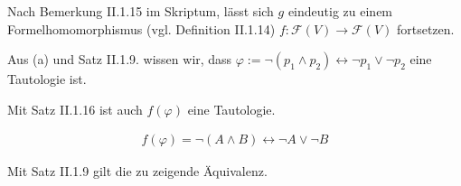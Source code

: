 \begin{solution}
\begin{enumerate}[label = \alph*.]
    Nach Bemerkung II.1.15 im Skriptum, lässt sich $g$ eindeutig zu einem Formelhomomorphismus (vgl. Definition II.1.14) $f:\mathcal{F}(V) \to \mathcal{F}(V)$ fortsetzen.


    Aus (a) und Satz II.1.9. wissen wir, dass $\varphi := \neg (p_1 \land p_2) \leftrightarrow \neg p_1 \lor \neg p_2$ eine Tautologie ist.


    Mit Satz II.1.16 ist auch $f(\varphi)$ eine Tautologie.

    \begin{align*}
        f(\varphi) = \neg (A \land B) \leftrightarrow \neg A \lor \neg B
    \end{align*}

    Mit Satz II.1.9 gilt die zu zeigende Äquivalenz.

\end{enumerate}

\end{solution}


